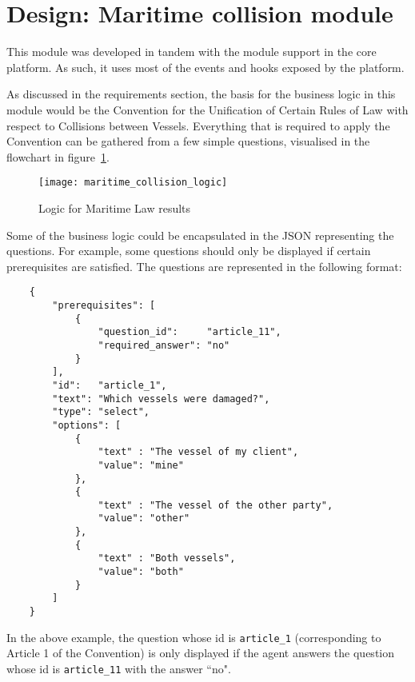 \section{Design: Maritime collision module}

This module was developed in tandem with the module support in the core platform. As such, it uses most of the events and hooks exposed by the platform.

As discussed in the requirements section, the basis for the business logic in this module would be the Convention for the Unification of Certain Rules of Law with respect to Collisions between Vessels. Everything that is required to apply the Convention can be gathered from a few simple questions, visualised in the flowchart in figure~\ref{uml:maritimeLogic}.

\begin{figure}[h!]
  \centering
    \ifimages
    \texttt{[image: maritime\_collision\_logic]}
    \fi
  \caption{Logic for Maritime Law results}
  \label{uml:maritimeLogic}
\end{figure}

Some of the business logic could be encapsulated in the JSON representing the questions. For example, some questions should only be displayed if certain prerequisites are satisfied. The questions are represented in the following format:

\begin{minipage}{\textwidth}
\begin{lstlisting}
    {
        "prerequisites": [
            {
                "question_id":     "article_11",
                "required_answer": "no"
            }
        ],
        "id":   "article_1",
        "text": "Which vessels were damaged?",
        "type": "select",
        "options": [
            {
                "text" : "The vessel of my client",
                "value": "mine"
            },
            {
                "text" : "The vessel of the other party",
                "value": "other"
            },
            {
                "text" : "Both vessels",
                "value": "both"
            }
        ]
    }
\end{lstlisting}
\end{minipage}

In the above example, the question whose id is \lstinline{article_1} (corresponding to Article 1 of the Convention) is only displayed if the agent answers the question whose id is \lstinline{article_11} with the answer ``no".

